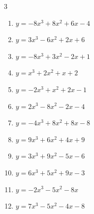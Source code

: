 \begin{multicols}{3}
\begin{enumerate}
  \item $y=-8x^{3}+8x^{2}+6x-4$


  \item $y=3x^{3}-6x^{2}+2x+6$


  \item $y=-8x^{3}+3x^{2}-2x+1$


  \item $y=x^{3}+2x^{2}+x+2$


  \item $y=-2x^{3}+x^{2}+2x-1$


  \item $y=2x^{3}-8x^{2}-2x-4$


  \item $y=-4x^{3}+8x^{2}+8x-8$


  \item $y=9x^{3}+6x^{2}+4x+9$


  \item $y=3x^{3}+9x^{2}-5x-6$


  \item $y=6x^{3}+5x^{2}+9x-3$


  \item $y=-2x^{3}-5x^{2}-8x$


  \item $y=7x^{3}-5x^{2}-4x-8$


\columnbreak %


\end{enumerate}
\end{multicols}
